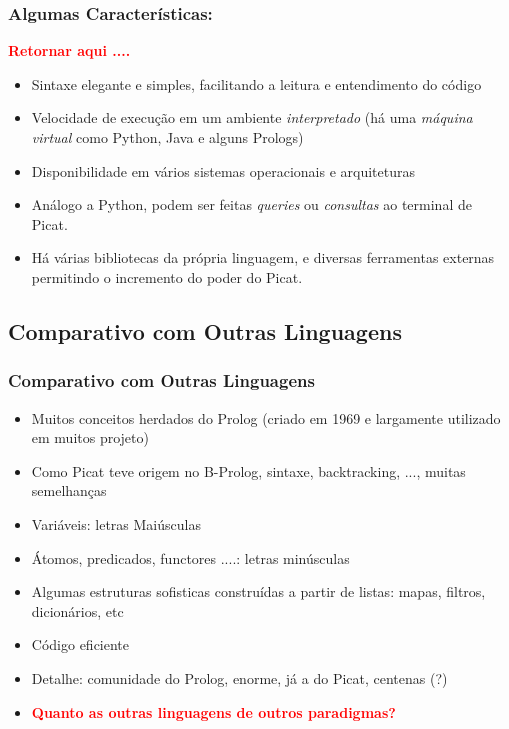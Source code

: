
\begin{frame}[fragile]
    \frametitle{Algumas Características:}

\textbf{\textcolor{red}{Retornar aqui ....}}
    \begin{itemize}
    
    \pause 
      \item Sintaxe elegante e simples, facilitando a leitura e entendimento do código
      
          \pause 
      \item Velocidade de execução em um ambiente \textit{interpretado} (há
      uma \textit{máquina   virtual} como Python, Java e alguns Prologs)
      
          \pause 
      \item Disponibilidade em vários sistemas operacionais e arquiteturas
      
      \pause 
      \item Análogo a Python, podem ser feitas \textit{queries}
      ou \textit{consultas} ao terminal de Picat.

      \pause 
      \item Há várias bibliotecas da própria linguagem, e diversas ferramentas
      externas permitindo o incremento do poder do Picat.
      
    \end{itemize}
\end{frame}

\subsection{Comparativo com Outras Linguagens}

\begin{frame}[fragile]
	\frametitle{Comparativo com Outras Linguagens}
	
	
	\begin{itemize}

	\item Muitos conceitos herdados do Prolog (criado em 1969 e largamente utilizado em muitos projeto)
	\item Como Picat teve origem no B-Prolog, sintaxe, backtracking, ..., muitas semelhanças
	\pause
	\item Variáveis: letras Maiúsculas
	\item Átomos, predicados, functores ....: letras minúsculas
   \item  Algumas estruturas sofisticas construídas a partir de listas: mapas, filtros, dicionários, etc
   \item Código eficiente
	\pause
	
   \item Detalhe: comunidade do Prolog, enorme, já a do Picat, centenas (?)
   \item {\bf \textcolor{red}{Quanto as outras linguagens de outros paradigmas?}}

      
\end{itemize}
\end{frame}


